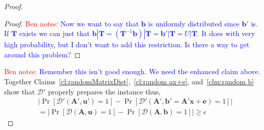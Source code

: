 \documentclass[11pt]{article}
\newcommand{\vect}[1]{\ensuremath{\textbf{#1}}}
\newcommand{\D}{\mathcal{D}}
\newcommand{\authnote}[2]{{\textcolor{red}{\textsf{#1 notes: }\textcolor{blue}{ #2}}\marginpar{\textcolor{red}{\textbf{!!!!!}}}}}
\newcommand{\authnote}[2]{}
\newcommand{\bnote}[1]{{\authnote{Ben}{#1}}}
\newcommand{\ve}{\vect{e}}
\newcommand{\vA}{\vect{A}}
\newcommand{\vT}{\vect{T}}
\newcommand{\vx}{\vect{x}}
\newcommand{\vb}{\vect{b}}
\newcommand{\vu}{\vect{u}}
\newcommand{\ignore}[1]{}
\begin{document}
{\begin{proof}
\begin{proof}
 \bnote{Now we want to say that $\vb$ is uniformly distributed since $\vb'$ is.  If $\vT$ exists we can just that $\vb | \vT = (\vT^{-1} \vb )| \vT = \vb' | \vT = U | \vT$.  It does with very high probability, but I don't want to add this restriction.  Is there a way to get around this problem?}
\end{proof}
\bnote{Remember this isn't good enough.  We need the enhanced claim above.}
Together Claims~\ref{cl:randomMatrixDist},~\ref{cl:random ax+e}, and~\ref{clm:random b} show that $\D'$ properly prepares the instance thus, 
\begin{align*}
&\left|\Pr\left[\D'(\vA', \vu') = 1\right]- \Pr\left[\D'(\vA', \vb'=\vA'\vx + \ve)=1\right]  \right|\\
& =\left|\Pr\left[\D(\vA, \vu)=1\right]- \Pr\left[\D(\vA, \vb)=1\right]  \right|\geq \epsilon
\end{align*}
\ignore{
Before randomized:
$$\vA'\vx' + \ve = \vb'$$
For $i = 1\ldots m$,
$$\sum^{n+\alpha}_{j=1}A_{ij}x_j + e_i = b_i$$
For $i = 1\ldots \alpha$,
$$\sum^{n+\alpha}_{j=1}A_{(m+i)j}x_j = \sum^{n}_{j=1}F_{ij}x_j + x_{n+i} = b_{m+i}$$
}
\end{proof}
}
\end{document}
